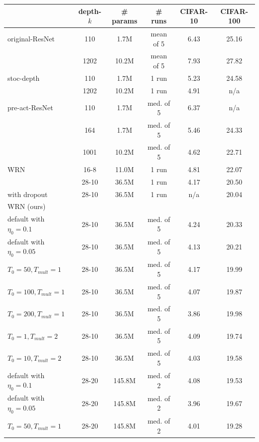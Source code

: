 \documentclass{article}
\begin{document}
\begin{table}[t]
\renewcommand{\arraystretch}{1.2}
\begin{center}
  \begin{tabular}{ l | c | c | c | c | c }
    \hline
				& depth-$k$ & \# params & \# runs  & CIFAR-10 & CIFAR-100 \\ \hline
    original-ResNet \citep{he2015deep} & 110 & 1.7M & mean of 5	& 6.43 &  25.16 \\ 
		& 1202 & 10.2M & mean of 5	& 7.93 &   27.82 \\ \hline
		stoc-depth 	\citep{huang2016deep}		& 110 & 1.7M & 1 run	 & 5.23 &  24.58 \\ 
										& 1202 & 10.2M & 1 run	&  4.91 &   n/a \\ \hline
		pre-act-ResNet \citep{he2016identity} 	& 110 & 1.7M & med. of 5	& 6.37 &   n/a \\ 
									  & 164 & 1.7M & med. of 5	& 5.46 &   24.33 \\ 
										& 1001 & 10.2M & med. of 5	& 4.62 &  22.71 \\ \hline								
    WRN \citep{zagoruyko2016wide}	& 16-8 & 11.0M & 1 run	& 4.81 & 22.07 \\
										& 28-10 &  36.5M  & 1 run	& 4.17 &  20.50 \\
		with dropout		& 28-10 &  36.5M  & 1 run & n/a &  20.04 \\ \hline	
		WRN (ours)			&   &    &   &   \\
		default with $\eta_0=0.1$		& 28-10 &  36.5M & med. of 5		   & 4.24 & 20.33 \\
		default with $\eta_0=0.05$	& 28-10 &  36.5M & med. of 5			& 4.13 & 20.21 \\
		$T_0=50, T_{mult}=1$	& 28-10 &  36.5M & med. of 5		& 4.17 & 19.99 \\
		$T_0=100, T_{mult}=1$	& 28-10 &  36.5M & med. of 5			& 4.07 & 19.87 \\
		$T_0=200, T_{mult}=1$	& 28-10 &  36.5M & med. of 5			& 3.86 & 19.98 \\
		$T_0=1, T_{mult}=2$		& 28-10 &  36.5M & med. of 5		& 4.09 & 19.74 \\
		$T_0=10, T_{mult}=2$	& 28-10 &  36.5M & med. of 5			& 4.03 & 19.58 \\ \hline	
		default with $\eta_0=0.1$		& 28-20 &  145.8M & med. of 2		   & 4.08 & 19.53 \\
		default with $\eta_0=0.05$	& 28-20 &  145.8M & med. of 2			& 3.96 & 19.67 \\
		$T_0=50, T_{mult}=1$	& 28-20 &  145.8M & med. of 2		& 4.01 & 19.28 \\

\end{tabular}
\end{center}
\end{table}
\end{document}
